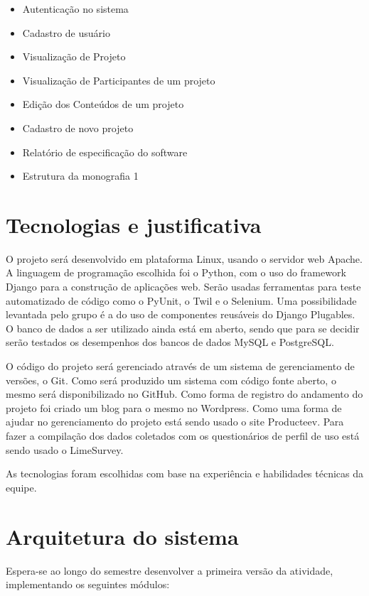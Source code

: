 \documentclass[a4paper,12pt,font=plain,header=plain]{abnt}
\begin{document}
	\begin{itemize}
	 \item Autenticação no sistema
	 \item Cadastro de usuário
	 \item Visualização de Projeto
	 \item Visualização de Participantes de um projeto
	 \item Edição dos Conteúdos de um projeto
	 \item Cadastro de novo projeto
	 \item Relatório de especificação do software
	 \item Estrutura da monografia 1
	\end{itemize}


  \section{Tecnologias e justificativa}
    O projeto será desenvolvido em plataforma Linux, usando o servidor web Apache. A linguagem de programação escolhida foi o Python, com o uso do framework Django para a construção de aplicações web. Serão usadas ferramentas para teste automatizado de código como o PyUnit, o Twil e o Selenium. Uma possibilidade levantada pelo grupo é a do uso de componentes reusáveis do Django Plugables. O banco de dados a ser utilizado ainda está em aberto, sendo que para se decidir serão testados os desempenhos dos bancos de dados MySQL e PostgreSQL.

    O código do projeto será gerenciado através de um sistema de gerenciamento de versões, o Git. Como será produzido um sistema com código fonte aberto, o mesmo será disponibilizado no GitHub. Como forma de registro do andamento do projeto foi criado um blog para o mesmo no Wordpress. Como uma forma de ajudar no gerenciamento do projeto está sendo usado o site Producteev. Para fazer a compilação dos dados coletados com os questionários de perfil de uso está sendo usado o LimeSurvey.

    As tecnologias foram escolhidas com base na experiência e habilidades técnicas da equipe.

  \section{Arquitetura do sistema}

    Espera-se ao longo do semestre desenvolver a primeira versão da atividade, implementando os seguintes módulos:
\end{document}
